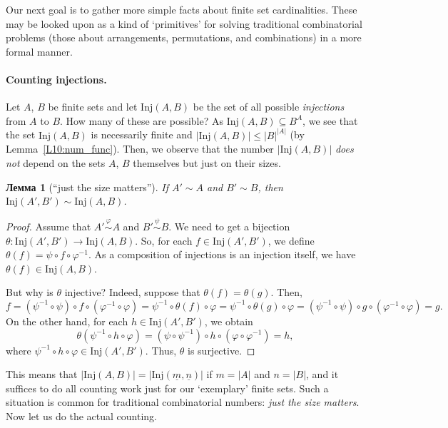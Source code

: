 \documentclass[12pt,notitlepage]{article}
\theoremstyle{plain}
\newtheorem{lemma}[thm]{Лемма}
\theoremstyle{definition}
\theoremstyle{plain}
\newcommand{\sbs}{\subseteq}
\renewcommand{\phi}{\varphi}
\newcommand{\ul}[1]{\underline{#1}}
\newcommand{\1}{\mathbf{1}}
\newcommand{\0}{\mathbf{0}}
\newcommand{\mcomm}[1]{}
\begin{document}
Our next goal is to gather more simple facts about finite set cardinalities. These may be looked upon as a kind of `primitives' for solving traditional combinatorial problems (those about arrangements, permutations, and combinations) in a more formal manner.

\paragraph{Counting injections.} Let $A$, $B$ be finite sets and let $\mathrm{Inj}(A,B)$ be the set of all possible \emph{injections} from $A$ to $B$.
How many of these are possible? As $\mathrm{Inj}(A,B) \sbs B^A$, we see that the set $\mathrm{Inj}(A,B)$ is necessarily finite and $|\mathrm{Inj}(A,B)| \leq |B|^{|A|}$ (by Lemma~\ref{L10:num_func}). Then, we observe that the number $|\mathrm{Inj}(A,B)|$ \emph{does not} depend on the sets $A$, $B$ themselves but just on their sizes.

\mcomm{Given enough time (which is unlikely in practice), the Instructor might prove similar results for all the following `combinatorial numbers' (which are omitted traditionally). We do not do it nevertheless.}
\begin{lemma}[``just the size matters'']\label{L11:JSM}
	If $A' \sim A$ and $B' \sim B$, then $\mathrm{Inj}(A',B') \sim \mathrm{Inj}(A,B)$.
\end{lemma}
\begin{proof}
	Assume that $A' \stackrel{\phi}{\sim} A$ and $B' \stackrel{\psi}{\sim} B$. We need to get a bijection $\theta\colon \mathrm{Inj}(A',B') \to \mathrm{Inj}(A,B)$. So, for each $f \in \mathrm{Inj}(A',B')$, we define $\theta(f) = \psi \circ f \circ \phi^{-1}$. As a composition of injections is an injection itself, we have $\theta(f) \in \mathrm{Inj}(A,B)$.
	
	But why is $\theta$ injective? Indeed, suppose that $\theta(f) = \theta(g)$. Then,
	$$f = (\psi^{-1} \circ \psi) \circ f \circ (\phi^{-1} \circ \phi) = \psi^{-1} \circ \theta(f) \circ \phi = \psi^{-1} \circ \theta(g) \circ \phi = (\psi^{-1} \circ \psi) \circ g \circ (\phi^{-1} \circ \phi) = g.$$
	On the other hand, for each $h \in \mathrm{Inj}(A',B')$, we obtain
	$$\theta(\psi^{-1} \circ h \circ \phi) = (\psi \circ \psi^{-1}) \circ h \circ (\phi \circ \phi^{-1}) = h,$$
	where $\psi^{-1} \circ h \circ \phi \in \mathrm{Inj}(A',B')$. Thus, $\theta$ is surjective.
\end{proof}
This means that $|\mathrm{Inj}(A,B)| = |\mathrm{Inj}(\ul{m},\ul{n})|$ if $m = |A|$ and $n = |B|$, and it suffices to do all counting work just for our `exemplary' finite sets. Such a situation is common for traditional combinatorial numbers: \emph{just the size matters}. Now let us do the actual counting.
\end{document}
